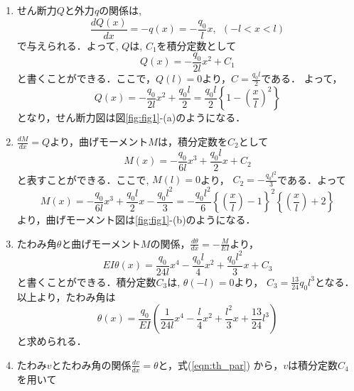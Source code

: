 \documentclass[10pt,a4j]{jarticle}
\begin{document}
\begin{enumerate}
\item
せん断力$Q$と外力$q$の関係は,
\begin{equation}
	\frac{dQ(x)}{dx} = -q(x) = -\frac{q_0}{l}x
	, \ \ \left(-l < x < l \right)
	\label{eqn:Q_q}
\end{equation}
で与えられる．よって, $Q$は, $C_1$を積分定数として
\begin{equation}
	Q(x) =	-\frac{q_0}{2l}x^2+C_1
	\label{eqn:Q_gen}
\end{equation}
と書くことができる．ここで，$Q\left(l \right)=0$より，$C=\frac{q_0l}{2}$である．
よって，
\begin{equation}
	Q(x) = -\frac{q_0}{2l}x^2+\frac{q_0l}{2}
	=\frac{q_0l}{2}\left\{1-\left(\frac{x}{l}\right)^2\right\}
	\label{eqn:Q_par}
\end{equation}
となり，せん断力図は図\ref{fig:fig1}-(a)のようになる．
\item
$\frac{dM}{dx}=Q$より，曲げモーメント$M$は，積分定数を$C_2$として
\begin{equation}
	M(x) =
	-\frac{q_0}{6l}x^3+\frac{q_0l}{2}x +C_2
	\label{eqn:M_gen}
\end{equation}
と表すことができる．ここで, $M\left(l\right)=0$より，
$C_2=-\frac{q_0l^2}{3}$である．よって
\begin{equation}
	M(x) = 
	-\frac{q_0}{6l}x^3+\frac{q_0l}{2}x -\frac{q_0l^2}{3}
	=
	-\frac{q_0l^2}{6}
	\left\{
		\left(\frac{x}{l}\right)-1
	\right \}^2
	\left\{
		\left(\frac{x}{l}\right)+2
	\right \}
	\label{eqn:M_par}
\end{equation}
より，曲げモーメント図は\ref{fig:fig1}-(b)のようになる．
\item
たわみ角$\theta$と曲げモーメント$M$の関係，$\frac{d\theta}{dx}=-\frac{M}{EI}$より，
\begin{equation}
	EI \theta(x) = 
	\frac{q_0}{24l}x^4-\frac{q_0l}{4}x^2 +\frac{q_0l^2}{3}x +C_3
	\label{eqn:th_gen}
\end{equation}
と書くことができる．積分定数$C_3$は, $\theta\left(-l\right)=0$より，
$C_3=\frac{13}{24}q_0l^3$となる．以上より，たわみ角は
\begin{equation}
	\theta(x) = 
	\frac{q_0}{EI}	
	\left(
	\frac{1}{24l}x^4-\frac{l}{4}x^2 +\frac{l^2}{3}x +\frac{13}{24}l^3
	\right)
	\label{eqn:th_par}
\end{equation}
と求められる．
\item
たわみ$v$とたわみ角の関係$\frac{dv}{dx}=\theta$と，式(\ref{eqn:th_par})
から，$v$は積分定数$C_4$を用いて
\begin{equation}

\end{equation}
\end{enumerate}
\end{document}
